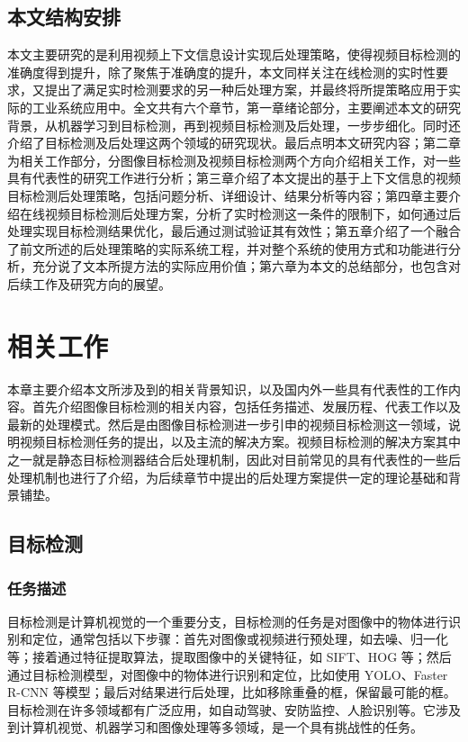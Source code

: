 \documentclass[winfonts,master,twoside,AutoFakeBold= {2}]{njuthesis}
\begin{document}
\section{本文结构安排}
本文主要研究的是利用视频上下文信息设计实现后处理策略，使得视频目标检测的准确度得到提升，除了聚焦于准确度的提升，本文同样关注在线检测的实时性要求，又提出了满足实时检测要求的另一种后处理方案，并最终将所提策略应用于实际的工业系统应用中。全文共有六个章节，第一章绪论部分，主要阐述本文的研究背景，从机器学习到目标检测，再到视频目标检测及后处理，一步步细化。同时还介绍了目标检测及后处理这两个领域的研究现状。最后点明本文研究内容；第二章为相关工作部分，分图像目标检测及视频目标检测两个方向介绍相关工作，对一些具有代表性的研究工作进行分析；第三章介绍了本文提出的基于上下文信息的视频目标检测后处理策略，包括问题分析、详细设计、结果分析等内容；第四章主要介绍在线视频目标检测后处理方案，分析了实时检测这一条件的限制下，如何通过后处理实现目标检测结果优化，最后通过测试验证其有效性；第五章介绍了一个融合了前文所述的后处理策略的实际系统工程，并对整个系统的使用方式和功能进行分析，充分说了文本所提方法的实际应用价值；第六章为本文的总结部分，也包含对后续工作及研究方向的展望。

\chapter{相关工作}
本章主要介绍本文所涉及到的相关背景知识，以及国内外一些具有代表性的工作内容。首先介绍图像目标检测的相关内容，包括任务描述、发展历程、代表工作以及最新的处理模式。然后是由图像目标检测进一步引申的视频目标检测这一领域，说明视频目标检测任务的提出，以及主流的解决方案。视频目标检测的解决方案其中之一就是静态目标检测器结合后处理机制，因此对目前常见的具有代表性的一些后处理机制也进行了介绍，为后续章节中提出的后处理方案提供一定的理论基础和背景铺垫。 

\section{目标检测}
\subsection{任务描述}
目标检测是计算机视觉的一个重要分支，目标检测的任务是对图像中的物体进行识别和定位，通常包括以下步骤：首先对图像或视频进行预处理，如去噪、归一化等；接着通过特征提取算法，提取图像中的关键特征，如 SIFT、HOG 等；然后通过目标检测模型，对图像中的物体进行识别和定位，比如使用 YOLO、Faster R-CNN 等模型；最后对结果进行后处理，比如移除重叠的框，保留最可能的框。目标检测在许多领域都有广泛应用，如自动驾驶、安防监控、人脸识别等。它涉及到计算机视觉、机器学习和图像处理等多领域，是一个具有挑战性的任务。
\end{document}
